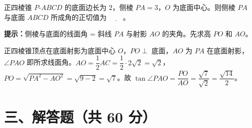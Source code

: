 \documentclass{exam-zh}
\begin{document}
\begin{question}[points=10]
  \noindent
  \begin{minipage}[t]{\dimexpr\linewidth-70mm-6mm\relax}
    \vspace{0pt}
    正四棱锥 $P\text{-}ABCD$ 的底面边长为 $2$，侧棱 $PA=3$，$O$ 为底面中心。则侧棱 $PA$ 与底面 $ABCD$ 所成角的正切值为 $\underline{\hspace{2em}}$。
    \begin{hintbox}
\textbf{提示：}侧棱与底面的线面角 = 斜线 $PA$ 与射影 $AO$ 的夹角。先求高 $PO$ 和 $AO$。\end{hintbox}

  \end{minipage}\hfill
  \begin{diagramcoltikz}{70mm}{正四棱锥，标出侧棱 $PA$、底面中心 $O$ 与高 $PO$。}
  }
  \end{diagramcoltikz}
  \begin{solutionblock}
    正四棱锥顶点在底面射影为底面中心 $O$，$PO\perp$ 底面，$AO$ 为 $PA$ 在底面射影，$\angle PAO$ 即所求线面角。$AO=\dfrac12 AC=\dfrac12\cdot 2\sqrt2=\sqrt2$，$PO=\sqrt{PA^2-AO^2}=\sqrt{9-2}=\sqrt7$。故 $\tan\angle PAO=\dfrac{PO}{AO}=\dfrac{\sqrt7}{\sqrt2}=\dfrac{\sqrt{14}}{2}$。
  \end{solutionblock}
\end{question}



\section*{三、解答题（共 60 分）}

\end{document}
